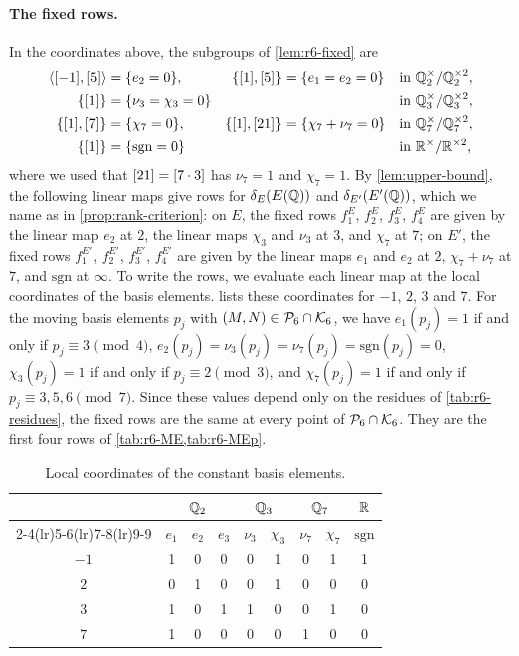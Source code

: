 \paragraph{The fixed rows.} In the coordinates above, the subgroups of \cref{lem:r6-fixed} are
\[
\begin{aligned}
\langle[-1],[5]\rangle&=\{e_2=0\}, & \{[1],[5]\}&=\{e_1=e_2=0\} &&\text{in } \mathbb Q_2^{\times}/\mathbb Q_2^{\times2},\\
\{[1]\}&=\{\nu_3=\chi_3=0\} &&&&\text{in } \mathbb Q_3^{\times}/\mathbb Q_3^{\times2},\\
\{[1],[7]\}&=\{\chi_7=0\}, & \{[1],[21]\}&=\{\chi_7+\nu_7=0\} &&\text{in } \mathbb Q_7^{\times}/\mathbb Q_7^{\times2},\\
\{[1]\}&=\{\mathrm{sgn}=0\} &&&&\text{in } \mathbb R^{\times}/\mathbb R^{\times2},
\end{aligned}
\]
where we used that $[21]=[7\cdot3]$ has $\nu_7=1$ and $\chi_7=1$. By \cref{lem:upper-bound}, the following linear maps give rows for $\delta_E(E(\mathbb Q))$ and $\delta_{E'}(E'(\mathbb Q))$, which we name as in \cref{prop:rank-criterion}: on $E$, the fixed rows $f^E_1$, $f^E_2$, $f^E_3$, $f^E_4$ are given by the linear map $e_2$ at $2$, the linear maps $\chi_3$ and $\nu_3$ at $3$, and $\chi_7$ at $7$; on $E'$, the fixed rows $f^{E'}_1$, $f^{E'}_2$, $f^{E'}_3$, $f^{E'}_4$ are given by the linear maps $e_1$ and $e_2$ at $2$, $\chi_7+\nu_7$ at $7$, and $\mathrm{sgn}$ at $\infty$. To write the rows, we evaluate each linear map at the local coordinates of the basis elements.  lists these coordinates for $-1$, $2$, $3$ and $7$. For the moving basis elements $p_j$ with $(M,N)\in\mathcal P_6\cap\mathcal K_6$, we have $e_1(p_j)=1$ if and only if $p_j\equiv3\pmod 4$, $e_2(p_j)=\nu_3(p_j)=\nu_7(p_j)=\mathrm{sgn}(p_j)=0$, $\chi_3(p_j)=1$ if and only if $p_j\equiv2\pmod3$, and $\chi_7(p_j)=1$ if and only if $p_j\equiv3,5,6\pmod7$. Since these values depend only on the residues of \cref{tab:r6-residues}, the fixed rows are the same at every point of $\mathcal P_6\cap\mathcal K_6$. They are the first four rows of \cref{tab:r6-ME,tab:r6-MEp}.

\begin{table}[htbp]
\centering
\caption{Local coordinates of the constant basis elements.}
\label{tab:r6-coords}
\begin{tabular}{ccccccccc}
\toprule
 & \multicolumn{3}{c}{$\mathbb Q_2$} & \multicolumn{2}{c}{$\mathbb Q_3$} & \multicolumn{2}{c}{$\mathbb Q_7$} & $\mathbb R$\\
\cmidrule(lr){2-4}\cmidrule(lr){5-6}\cmidrule(lr){7-8}\cmidrule(lr){9-9}
 & $e_1$ & $e_2$ & $e_3$ & $\nu_3$ & $\chi_3$ & $\nu_7$ & $\chi_7$ & $\mathrm{sgn}$\\
\midrule
$-1$ & 1 & 0 & 0 & 0 & 1 & 0 & 1 & 1\\
$2$ & 0 & 1 & 0 & 0 & 1 & 0 & 0 & 0\\
$3$ & 1 & 0 & 1 & 1 & 0 & 0 & 1 & 0\\
$7$ & 1 & 0 & 0 & 0 & 0 & 1 & 0 & 0\\
\bottomrule
\end{tabular}
\end{table}

